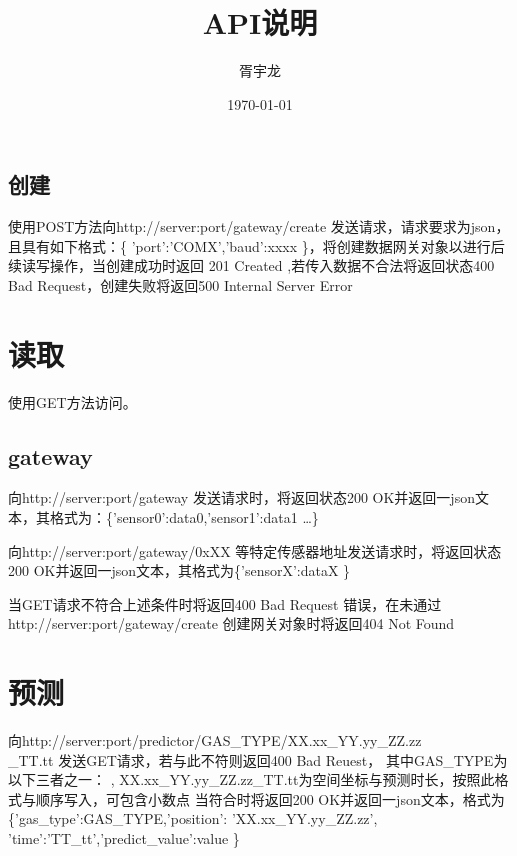 \documentclass[]{ctexart}
\title{API说明}
\author{胥宇龙}
\date{\today}
\begin{document}
\subsection{创建}
使用POST方法向http://server:port/gateway/create 发送请求，请求要求为json，且具有如下格式：\{ 'port':'COMX','baud':xxxx \}，将创建数据网关对象以进行后续读写操作，当创建成功时返回 201 Created ,若传入数据不合法将返回状态400 Bad Request，创建失败将返回500 Internal Server Error
\section{读取}

使用GET方法访问。
\subsection{gateway}
向http://server:port/gateway 发送请求时，将返回状态200 OK并返回一json文本，其格式为：\{'sensor0':data0,'sensor1':data1 \dots \}

向http://server:port/gateway/0xXX 等特定传感器地址发送请求时，将返回状态200 OK并返回一json文本，其格式为\{'sensorX':dataX \}

当GET请求不符合上述条件时将返回400 Bad Request 错误，在未通过http://server:port/gateway/create 创建网关对象时将返回404 Not Found

\section{预测}
向http://server:port/predictor/GAS\_TYPE/XX.xx\_YY.yy\_ZZ.zz\\\_TT.tt 发送GET请求，若与此不符则返回400 Bad Reuest，
其中GAS\_TYPE为以下三者之一： , XX.xx\_YY.yy\_ZZ.zz\_TT.tt为空间坐标与预测时长，按照此格式与顺序写入，可包含小数点
当符合时将返回200 OK并返回一json文本，格式为\{'gas\_type':GAS\_TYPE,'position': 'XX.xx\_YY.yy\_ZZ.zz',\\'time':'TT\_tt','predict\_value':value \}
\end{document}
